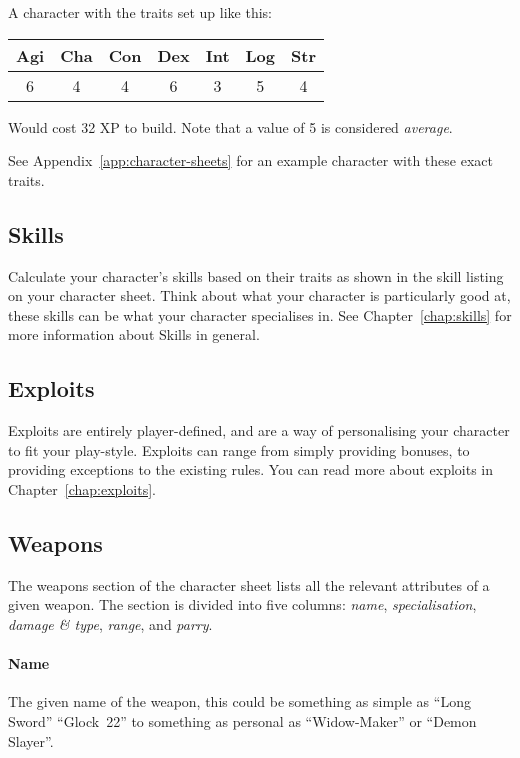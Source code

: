 \begin{example}
A character with the traits set up like this:

\begin{center}
    \begin{tabular}{ccccccc}
        \textbf{Agi} & \textbf{Cha} & \textbf{Con} & \textbf{Dex} & \textbf{Int} & \textbf{Log} & \textbf{Str} \\\hline
        6 & 4 & 4 & 6 & 3 & 5 & 4\\ 
    \end{tabular}
\end{center}
Would cost 32 XP to build.
Note that a value of 5 is considered \textit{average}.

See Appendix~\ref{app:character-sheets} for an example character with these exact traits.
\end{example}

\subsection{Skills}
Calculate your character's skills based on their traits as shown in the skill listing on your character sheet.
Think about what your character is particularly good at, these skills can be what your character specialises in.
See Chapter~\ref{chap:skills} for more information about Skills in general.

\subsection{Exploits}
Exploits are entirely player-defined, and are a way of personalising your character to fit your play-style.
Exploits can range from simply providing bonuses, to providing exceptions to the existing rules.
You can read more about exploits in Chapter~\ref{chap:exploits}.

\subsection{Weapons}
The weapons section of the character sheet lists all the relevant attributes of a given weapon.
The section is divided into five columns: \textit{name}, \textit{specialisation}, \textit{damage \& type}, \textit{range}, and \textit{parry}.

\paragraph{Name} The given name of the weapon, this could be something as simple as ``Long Sword'' ``Glock~22'' to something as personal as ``Widow-Maker'' or ``Demon Slayer''.

